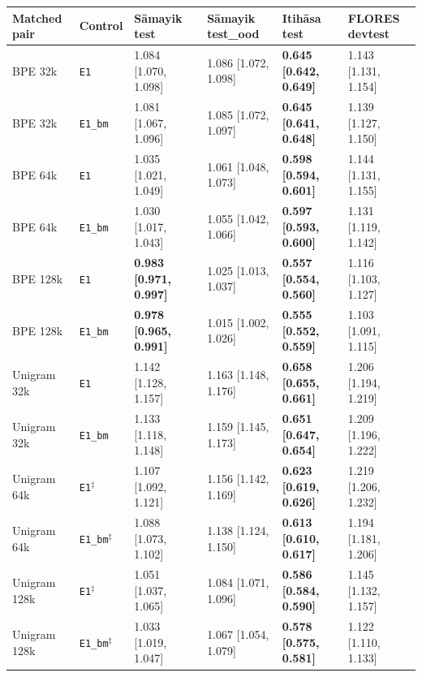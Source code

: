 \begin{table}[t]
\centering
\setlength{\tabcolsep}{3.4pt}
\scriptsize
\begin{tabular}{llllll}
\toprule
Matched pair & Control & S\=amayik test & S\=amayik test\_ood & Itih\=asa test & FLORES devtest \\
\midrule
BPE 32k & \texttt{E1} & 1.084 [1.070, 1.098] & 1.086 [1.072, 1.098] & \textbf{0.645 [0.642, 0.649]} & 1.143 [1.131, 1.154] \\
BPE 32k & \texttt{E1\_bm} & 1.081 [1.067, 1.096] & 1.085 [1.072, 1.097] & \textbf{0.645 [0.641, 0.648]} & 1.139 [1.127, 1.150] \\
BPE 64k & \texttt{E1} & 1.035 [1.021, 1.049] & 1.061 [1.048, 1.073] & \textbf{0.598 [0.594, 0.601]} & 1.144 [1.131, 1.155] \\
BPE 64k & \texttt{E1\_bm} & 1.030 [1.017, 1.043] & 1.055 [1.042, 1.066] & \textbf{0.597 [0.593, 0.600]} & 1.131 [1.119, 1.142] \\
BPE 128k & \texttt{E1} & \textbf{0.983 [0.971, 0.997]} & 1.025 [1.013, 1.037] & \textbf{0.557 [0.554, 0.560]} & 1.116 [1.103, 1.127] \\
BPE 128k & \texttt{E1\_bm} & \textbf{0.978 [0.965, 0.991]} & 1.015 [1.002, 1.026] & \textbf{0.555 [0.552, 0.559]} & 1.103 [1.091, 1.115] \\
Unigram 32k & \texttt{E1} & 1.142 [1.128, 1.157] & 1.163 [1.148, 1.176] & \textbf{0.658 [0.655, 0.661]} & 1.206 [1.194, 1.219] \\
Unigram 32k & \texttt{E1\_bm} & 1.133 [1.118, 1.148] & 1.159 [1.145, 1.173] & \textbf{0.651 [0.647, 0.654]} & 1.209 [1.196, 1.222] \\
Unigram 64k & \texttt{E1}$^{\ddagger}$ & 1.107 [1.092, 1.121] & 1.156 [1.142, 1.169] & \textbf{0.623 [0.619, 0.626]} & 1.219 [1.206, 1.232] \\
Unigram 64k & \texttt{E1\_bm}$^{\ddagger}$ & 1.088 [1.073, 1.102] & 1.138 [1.124, 1.150] & \textbf{0.613 [0.610, 0.617]} & 1.194 [1.181, 1.206] \\
Unigram 128k & \texttt{E1}$^{\ddagger}$ & 1.051 [1.037, 1.065] & 1.084 [1.071, 1.096] & \textbf{0.586 [0.584, 0.590]} & 1.145 [1.132, 1.157] \\
Unigram 128k & \texttt{E1\_bm}$^{\ddagger}$ & 1.033 [1.019, 1.047] & 1.067 [1.054, 1.079] & \textbf{0.578 [0.575, 0.581]} & 1.122 [1.110, 1.133] \\
\bottomrule
\end{tabular}

\end{table}
